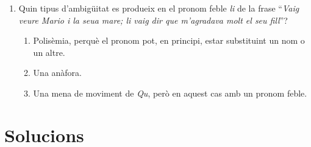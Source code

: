 \begin{enumerate}
\item Quin tipus d'ambigüitat 
es produeix en el pronom feble \emph{li} de
la frase ``\emph{Vaig veure Mario i la seua mare; li vaig dir que
m'agradava molt el seu fill}''?

\begin{enumerate}
\item Polisèmia, perquè el pronom pot, en principi, estar substituint un
nom o un altre.
\item Una anàfora.
\item Una mena de moviment de \emph{Qu}, però en aquest cas amb un
pronom feble.
\end{enumerate}


\end{enumerate}

\section{Solucions}

